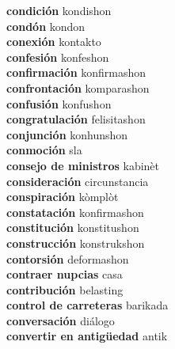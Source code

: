 \textbf{ condición  } kondishon \\
\textbf{ condón  } kondon \\
\textbf{ conexión  } kontakto \\
\textbf{ confesión  } konfeshon \\
\textbf{ confirmación  } konfirmashon \\
\textbf{ confrontación  } komparashon \\
\textbf{ confusión  } konfushon \\
\textbf{ congratulación  } felisitashon \\
\textbf{ conjunción  } konhunshon \\
\textbf{ conmoción  } sla \\
\textbf{ consejo de ministros  } kabinèt \\
\textbf{ consideración  } circunstancia \\
\textbf{ conspiración  } kòmplòt \\
\textbf{ constatación  } konfirmashon \\
\textbf{ constitución  } konstitushon \\
\textbf{ construcción  } konstrukshon \\
\textbf{ contorsión  } deformashon \\
\textbf{ contraer nupcias  } casa \\
\textbf{ contribución  } belasting \\
\textbf{ control de carreteras  } barikada \\
\textbf{ conversación  } diálogo \\
\textbf{ convertir en antigüedad  } antik \\
